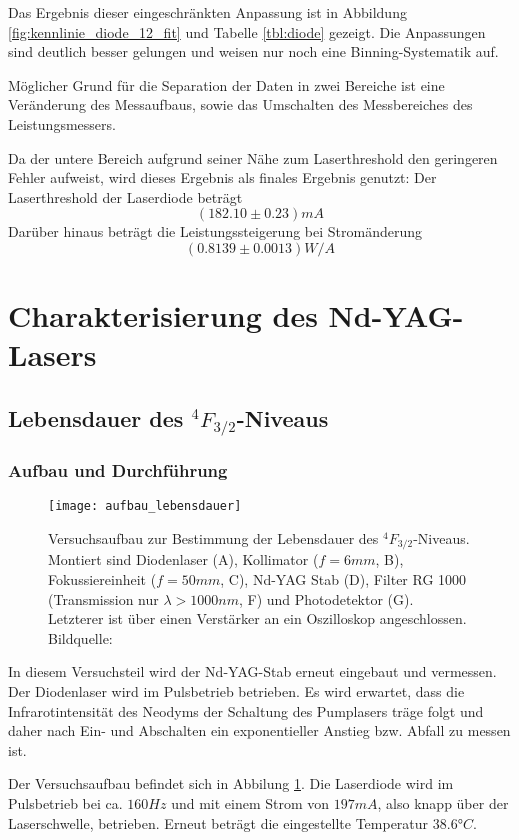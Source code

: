 \documentclass{../Misc/MontavonLaTeX/Montavon}
\newcommand{\fullwidth}{1.0\textwidth}
\begin{document}
Das Ergebnis dieser eingeschränkten Anpassung ist in Abbildung \ref{fig:kennlinie_diode_12_fit} und Tabelle \ref{tbl:diode} gezeigt. Die Anpassungen sind deutlich besser gelungen und weisen nur noch eine Binning-Systematik auf. 

Möglicher Grund für die Separation der Daten in zwei Bereiche ist eine Veränderung des Messaufbaus, sowie das Umschalten des Messbereiches des Leistungsmessers. 

Da der untere Bereich aufgrund seiner Nähe zum Laserthreshold den geringeren Fehler aufweist, wird dieses Ergebnis als finales Ergebnis genutzt:
Der Laserthreshold der Laserdiode beträgt 
\[ (182.10 \pm 0.23) \unit{mA} \]
Darüber hinaus beträgt die Leistungssteigerung bei Stromänderung
\[ (0.8139 \pm 0.0013) \unit{W/A} \]


\section{Charakterisierung des Nd-YAG-Lasers}

\subsection{Lebensdauer des $^4F_{3/2}$-Niveaus}
\subsubsection{Aufbau und Durchführung}
\begin{figure}[htbp]
\centering
\texttt{[image: aufbau\_lebensdauer]}
\caption{Versuchsaufbau zur Bestimmung der Lebensdauer des $^4F_{3/2}$-Niveaus. Montiert sind Diodenlaser (A), Kollimator ($f = 6 \unit{mm}$, B), Fokussiereinheit ($f = 50 \unit{mm}$, C), Nd-YAG Stab (D), Filter RG 1000 (Transmission nur $\lambda > 1000 \unit{nm}$, F) und Photodetektor (G). Letzterer ist über einen Verstärker an ein Oszilloskop angeschlossen. Bildquelle: \cite[S. 35]{anleitung1}}
\label{fig:aufbau_lebensdauer}
\end{figure}

In diesem Versuchsteil wird der Nd-YAG-Stab erneut eingebaut und vermessen. Der Diodenlaser wird im Pulsbetrieb betrieben. Es wird erwartet, dass die Infrarotintensität des Neodyms der Schaltung des Pumplasers träge folgt und daher nach Ein- und Abschalten ein exponentieller Anstieg bzw. Abfall zu messen ist.

Der Versuchsaufbau befindet sich in Abbilung \ref{fig:aufbau_lebensdauer}. Die Laserdiode wird im Pulsbetrieb bei ca. $160 \unit{Hz}$ und mit einem Strom von $197 \unit{mA}$, also knapp über der Laserschwelle, betrieben. Erneut beträgt die eingestellte Temperatur $38.6 \unit{\degree C}$.
\end{document}
